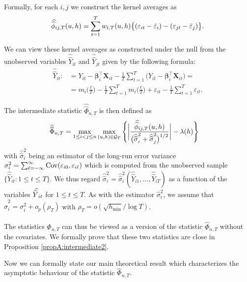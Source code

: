 \documentclass[a4paper,12pt]{article}
\newcommand{\doublehat}[1]{\skew{5.5}\widehat{\widehat{#1}}}
\newcommand{\doublehattwo}[1]{\widehat{\widehat{#1}}}
\begin{document}
Formally, for each $i,j$ we construct the kernel averages as 
\[\doublehat{\phi}_{ij,T}(u,h) = \sum_{t=1}^T w_{t,T}(u,h) \big\{ (\varepsilon_{it} - \bar{\varepsilon}_i) - (\varepsilon_{jt} - \bar{\varepsilon}_j)  \big\}. \]

We can view these kernel averages as constructed under the null from the unobserved variables $\doublehattwo{Y}_{it}$ and  $\doublehattwo{Y}_{jt}$ given by the following formula: 
\begin{align*}
\doublehattwo{Y}_{it} :&= Y_{it} - \bm{\beta}_i^\top \mathbf{X}_{it} -  \frac{1}{T}\sum_{t=1}^T \big(Y_{it} - \bm{\beta}_i^\top \mathbf{X}_{it}\big) =\\
&=m_i \Big( \frac{t}{T} \Big)  - \frac{1}{T}\sum_{t=1}^T  m_i \Big( \frac{t}{T} \Big) + \varepsilon_{it} - \frac{1}{T}\sum_{t=1}^T \varepsilon_{it}.
\end{align*}

The intermediate statistic $\doublehattwo{\Phi}_{n, T}$ is then defined as 
\begin{align}\label{eq:Phi_doublehat}
\doublehattwo{\Phi}_{n,T} &= \max_{1 \le i < j \le n}\max_{(u,h) \in \mathcal{G}_T} \Bigg\{\bigg|\frac{\doublehat{\phi}_{ij,T}(u,h)}{\big(\doublehattwo{\sigma}_i^2 + \doublehattwo{\sigma}_j^2\big)^{1/2}}\bigg| - \lambda(h)\Bigg\}
\end{align}
with $\doublehattwo{\sigma}_i^2$ being an estimator of the long-run error variance $\sigma_i^2 = \sum\nolimits_{\ell=-\infty}^{\infty} \textnormal{Cov}(\varepsilon_{i0}, \varepsilon_{i\ell})$ which is computed from the unobserved sample $\{ \doublehattwo{Y}_{it} : 1 \le t \le T \}$. We thus regard $\doublehattwo{\sigma}_i^2 = \doublehattwo{\sigma}_i^2(\doublehattwo{Y}_{i1},\ldots,\doublehattwo{Y}_{iT})$ as a function of the variables $\doublehat{Y}_{it}$ for $1 \le t \le T$. As with the estimator $\widehat{\sigma}_i^2$, we assume that $\doublehattwo{\sigma}_i^2 = \sigma_i^2 + o_p(\rho_T)$ with $\rho_T = o(\sqrt{h_{\min}}/\log T)$. 

The statistics $\doublehattwo{\Phi}_{n,T}$ can thus be viewed as a version of the statistic $\widehat{\Phi}_{n,T}$ without the covariates. We formally prove that these two statistics are close in Proposition \ref{propA:intermediate2}.

Now we can formally state our main theoretical result which characterizes the asymptotic behaviour of the statistic $\widehat{\Phi}_{n,T}$. 
\end{document}
